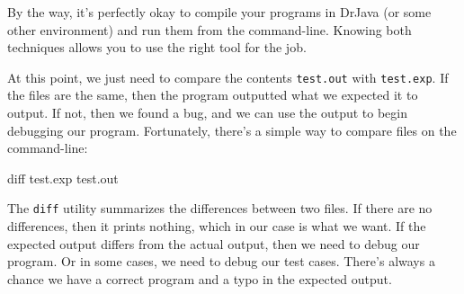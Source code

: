 By the way, it's perfectly okay to compile your programs in DrJava (or some other environment) and run them from the command-line.
Knowing both techniques allows you to use the right tool for the job.

At this point, we just need to compare the contents {\tt test.out} with {\tt test.exp}.
If the files are the same, then the program outputted what we expected it to output.
If not, then we found a bug, and we can use the output to begin debugging our program.
Fortunately, there's a simple way to compare files on the command-line:

\begin{stdout}
diff test.exp test.out
\end{stdout}

The {\tt diff} utility summarizes the differences between two files.
If there are no differences, then it prints nothing, which in our case is what we want.
If the expected output differs from the actual output, then we need to debug our program.
Or in some cases, we need to debug our test cases.
There's always a chance we have a correct program and a typo in the expected output.


